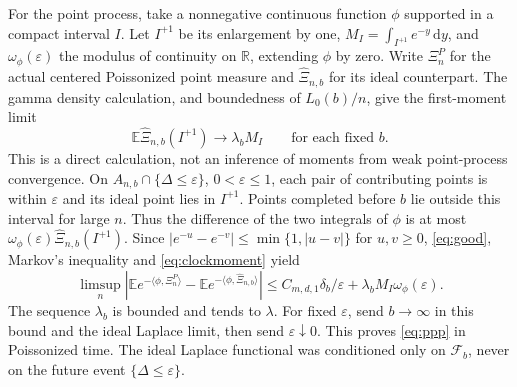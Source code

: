 \documentclass[11pt]{article}
\theoremstyle{remark}\newtheorem{remark}[theorem]{Remark}
\newcommand{\Ebb}{\mathbb E}
\newcommand{\Fcal}{\mathcal F}
\newcommand{\Rbb}{\mathbb R}
\newcommand{\dd}{\,\mathrm d}
\begin{document}
For the point process, take a nonnegative continuous function $\phi$
supported in a compact interval $I$. Let $I^{+1}$ be its enlargement by one,
$M_I=\int_{I^{+1}}e^{-y}\dd y$, and $\omega_\phi(\varepsilon)$ the modulus
of continuity on $\Rbb$, extending $\phi$ by zero. Write $\Xi_n^P$ for the
actual centered Poissonized point measure and $\widehat\Xi_{n,b}$ for its
ideal counterpart. The gamma density calculation, and boundedness of
$L_0(b)/n$, give the first-moment limit
\begin{equation}\label{eq:compactcount}
 \Ebb\widehat\Xi_{n,b}(I^{+1})\longrightarrow\lambda_b M_I
 \qquad\text{for each fixed }b.
\end{equation}
This is a direct calculation, not an inference of moments from weak
point-process convergence. On $A_{n,b}\cap\{\Delta\le\varepsilon\}$,
$0<\varepsilon\le1$, each pair of contributing points is within
$\varepsilon$ and its ideal point lies in $I^{+1}$. Points completed before
$b$ lie outside this interval for large $n$. Thus the difference of the
two integrals of $\phi$ is at most
$\omega_\phi(\varepsilon)\widehat\Xi_{n,b}(I^{+1})$.
Since $|e^{-u}-e^{-v}|\le\min\{1,|u-v|\}$ for $u,v\ge0$,
\eqref{eq:good}, Markov's inequality and \eqref{eq:clockmoment} yield
\begin{equation}\label{eq:laplaceerror}
 \limsup_n\left|\Ebb e^{-\langle\phi,\Xi_n^P\rangle}
        -\Ebb e^{-\langle\phi,\widehat\Xi_{n,b}\rangle}\right|
 \le C_{m,d,1}\delta_b/\varepsilon
       +\lambda_b M_I\omega_\phi(\varepsilon).
\end{equation}
The sequence $\lambda_b$ is bounded and tends to $\lambda$. For fixed
$\varepsilon$, send $b\to\infty$ in this bound and the ideal Laplace limit,
then send $\varepsilon\downarrow0$. This proves \eqref{eq:ppp} in
Poissonized time. The ideal Laplace functional was conditioned only on
$\Fcal_b$, never on the future event $\{\Delta\le\varepsilon\}$.
\end{document}
